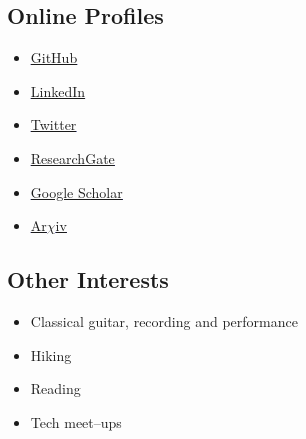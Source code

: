 \documentclass[11pt,a4paper,sans]{moderncv}        %
\begin{document}
\vspace{5pt}

\subsection{Online Profiles}

\vspace{5pt}
\small{
\begin{itemize}
\item{\textcolor{blue}{\underline{\href{https://github.com/LachlanMarnham}{GitHub}}}}

\vspace{6pt}


\item{\textcolor{blue}{\underline{\href{http://linkedin.com/in/lachlan-marnham-a463b190}{LinkedIn}}}}

\vspace{6pt}

\item{\textcolor{blue}{\underline{\href{https://twitter.com/LachlanMarnham}{Twitter}}}}

\vspace{6pt}

\item{\textcolor{blue}{\underline{\href{https://www.researchgate.net/profile/Lachlan_Marnham}{ResearchGate}}}}

\vspace{6pt}

\item{\textcolor{blue}{\underline{\href{https://scholar.google.co.uk/citations?user=5Vi60LYAAAAJ&hl=en}{Google Scholar}}}}

\vspace{6pt}

\item{\textcolor{blue}{\underline{\href{http://arxiv.org/a/marnham_l_1.html}{Ar$\chi$iv}}}}

\end{itemize}
\vspace{5pt}
\subsection{Other Interests}
\vspace{5pt}
\begin{itemize}
\item Classical guitar, recording and performance
\item Hiking
\item Reading
\item Tech meet--ups
\end{itemize} 
}
\end{document}
